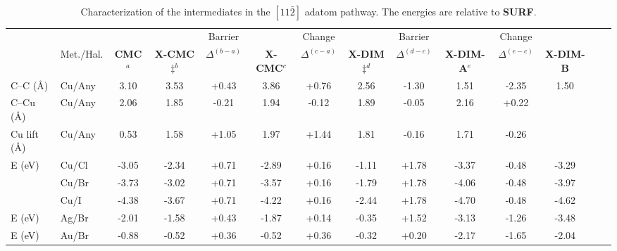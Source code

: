 \documentclass[aps,prb,reprint,amsmath,amssymb]{revtex4-1}
\begin{document}
\begin{table}
\centering
\caption{Characterization of the intermediates in the $[11\bar{2}]$ adatom pathway. %
The energies are relative to \textbf{SURF}. 
}
\label{table:adatom-longitude}
\begin{tabular}{ llcccccccccccc  }
 \hline
 \hline
  & & & & Barrier & & Change & & Barrier & &Change&\\
  & Met./Hal. & \textbf{CMC}$^{a}$ & \textbf{X-CMC$\ddagger$}$^{b}$ & $\Delta^{(b-a)}$ & \textbf{X-CMC}$^{c}$ &$\Delta^{(c-a)}$ & \textbf{X-DIM$\ddagger$}$^{d}$ & $\Delta^{(d-c)}$ & \textbf{X-DIM-A}$^{e}$ &$\Delta^{(e-c)}$ & \textbf{X-DIM-B}  \\ 
 \hline
 \hline 
 {C--C (\si{\angstrom})} & Cu/Any & {3.10} & {3.53} & {+0.43} & {3.86} &{+0.76} & {2.56} & {-1.30} & {1.51} &{-2.35} &{1.50}\\ 
 \hline
 {C--Cu (\si{\angstrom}) } & Cu/Any & {2.06} & {1.85} & {-0.21} & {1.94} &{-0.12} & {1.89} & {-0.05} & {2.16} &{+0.22} & \\ 
 \hline
 {Cu lift (\si{\angstrom}) } & Cu/Any & {0.53} & {1.58} & {+1.05} & {1.97} &{+1.44} & {1.81} & {-0.16} & {1.71} &{-0.26} & \\ 
 \hline
 \multirow{3}{*}{E (\si{\electronvolt}) } & Cu/Cl & -3.05 &-2.34 & +0.71 &-2.89 &+0.16 &-1.11 & +1.78 & -3.37&-0.48&-3.29\\ 
 & Cu/Br &-3.73 &-3.02 &+0.71 & -3.57 &+0.16 &-1.79 & +1.78 & -4.06 & -0.48&-3.97 \\ 
 & Cu/I  & -4.38 & -3.67 & +0.71 & -4.22 &+0.16 &-2.44 & +1.78 & -4.70 & -0.48&-4.62\\ 
 \hline
 E (\si{\electronvolt}) & Ag/Br &-2.01 &-1.58 &+0.43 &-1.87 &+0.14 &-0.35 &+1.52 &-3.13 &-1.26 &-3.48 \\ 
 E (\si{\electronvolt}) & Au/Br &-0.88 &-0.52 &+0.36 &-0.52 &+0.36 &-0.32 &+0.20 &-2.17 &-1.65 &-2.04 \\
  \hline
 \hline
\end{tabular}
\end{table}

\end{document}
